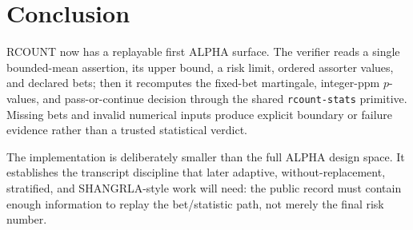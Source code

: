 \section{Conclusion}

RCOUNT now has a replayable first ALPHA surface. The verifier reads a single
bounded-mean assertion, its upper bound, a risk limit, ordered assorter values,
and declared bets; then it recomputes the fixed-bet martingale, integer-ppm
$p$-values, and pass-or-continue decision through the shared
\texttt{rcount-stats} primitive. Missing bets and invalid numerical inputs
produce explicit boundary or failure evidence rather than a trusted statistical
verdict.

The implementation is deliberately smaller than the full ALPHA design space. It
establishes the transcript discipline that later adaptive, without-replacement,
stratified, and SHANGRLA-style work will need: the public record must contain
enough information to replay the bet/statistic path, not merely the final risk
number.
